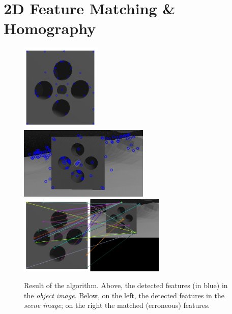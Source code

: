 \section{2D Feature Matching \& Homography}
\begin{figure}[H]
	\centering
	\includegraphics[width=3.8cm]{new_featHomog_SURF_templKeyPoint}\\
	\vspace{15px}
	\includegraphics[width=6.2cm]{new_featHomog_SURF_cameraKeyPoint}
	\qquad
	\includegraphics[width=7cm]{new_featHomog_SURF_result}
	\caption[Result of 2D Feature Matching]{Result of the algorithm. Above, the detected features (in blue) in the \textit{object image}. Below, on the left, the detected features in the \textit{scene image}; on the right the matched (erroneous) features.}
	\label{fig:featHomog}
\end{figure}

